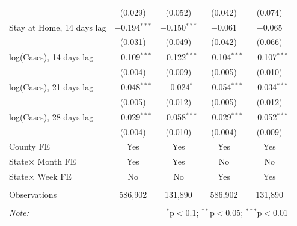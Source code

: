 \documentclass{beamer}
\begin{document}
\begin{frame}
\begin{table}[!htbp]
{\begin{tabular}{@{\extracolsep{1pt}}lcccc}
  & (0.029) & (0.052) & (0.042) & (0.074) \\ 
 Stay at Home, 14 days lag & $-$0.194$^{***}$ & $-$0.150$^{***}$ & $-$0.061 & $-$0.065 \\ 
  & (0.031) & (0.049) & (0.042) & (0.066) \\ \hline 
 log(Cases), 14 days lag & $-$0.109$^{***}$ & $-$0.122$^{***}$ & $-$0.104$^{***}$ & $-$0.107$^{***}$ \\ 
  & (0.004) & (0.009) & (0.005) & (0.010) \\ 
 log(Cases), 21 days lag  & $-$0.048$^{***}$ & $-$0.024$^{*}$ & $-$0.054$^{***}$ & $-$0.034$^{***}$ \\ 
  & (0.005) & (0.012) & (0.005) & (0.012) \\ 
 log(Cases), 28 days lag   & $-$0.029$^{***}$ & $-$0.058$^{***}$ & $-$0.029$^{***}$ & $-$0.052$^{***}$ \\ 
  & (0.004) & (0.010) & (0.004) & (0.009) \\  
   \hline \hline
\alert{County FE} & Yes & Yes &  Yes  &  Yes  \\  
\alert{State$\times$ Month FE}& Yes & Yes &  No  &  No  \\ 
\alert{State$\times$ Week FE}&No & No &  Yes  &  Yes  \\ 
\hline \\[-1.8ex] 
Observations & 586,902 & 131,890 & 586,902 & 131,890 \\ 
\hline 
\hline \\[-1.8ex] 
\textit{Note:}  & \multicolumn{4}{r}{$^{*}$p$<$0.1; $^{**}$p$<$0.05; $^{***}$p$<$0.01}  
\end{tabular}} 
\end{table}

\end{frame} 
\end{document}

